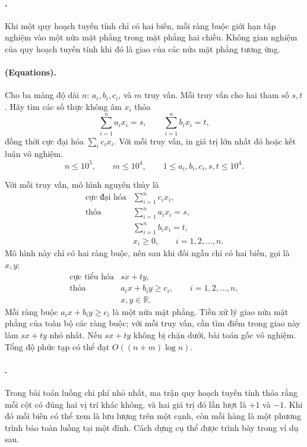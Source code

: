 \documentclass[11pt]{article}
\begin{document}
\paragraph{.}
Khi một quy hoạch tuyến tính chỉ có hai biến, mỗi ràng buộc giới hạn tập
nghiệm vào một nửa mặt phẳng trong mặt phẳng hai chiều. Không gian nghiệm của
quy hoạch tuyến tính khi đó là giao của các nửa mặt phẳng tương ứng.

\paragraph{ (Equations).}
Cho ba mảng độ dài \(n\): \(a_i,b_i,c_i\), và \(m\) truy vấn. Mỗi truy vấn cho
hai tham số \(s,t\). Hãy tìm các số thực không âm \(x_i\) thỏa
\[
  \sum_{i=1}^{n}a_ix_i=s,\qquad
  \sum_{i=1}^{n}b_ix_i=t,
\]
đồng thời cực đại hóa \(\sum_i c_ix_i\). Với mỗi truy vấn, in giá trị lớn
nhất đó hoặc kết luận vô nghiệm.
\[
  n\le 10^5,\qquad m\le 10^4,\qquad
  1\le a_i,b_i,c_i,s,t\le 10^4.
\]

Với mỗi truy vấn, mô hình nguyên thủy là
\[
\begin{array}{ll}
\text{cực đại hóa} & \displaystyle \sum_{i=1}^{n}c_ix_i,\\
\text{thỏa} & \displaystyle \sum_{i=1}^{n}a_ix_i=s,\\
& \displaystyle \sum_{i=1}^{n}b_ix_i=t,\\
& x_i\ge 0,\qquad i=1,2,\ldots,n.
\end{array}
\]
Mô hình này chỉ có hai ràng buộc, nên sau khi đối ngẫu chỉ có hai biến, gọi là
\(x,y\):
\[
\begin{array}{ll}
\text{cực tiểu hóa} & sx+ty,\\
\text{thỏa} & a_ix+b_iy\ge c_i,\qquad i=1,2,\ldots,n,\\
& x,y\in\mathbb{R}.
\end{array}
\]
Mỗi ràng buộc \(a_ix+b_iy\ge c_i\) là một nửa mặt phẳng. Tiền xử lý giao nửa
mặt phẳng của toàn bộ các ràng buộc; với mỗi truy vấn, cần tìm điểm trong
giao này làm \(sx+ty\) nhỏ nhất. Nếu \(sx+ty\) không bị chặn dưới, bài toán
gốc vô nghiệm. Tổng độ phức tạp có thể đạt \(O((n+m)\log n)\).

\paragraph{.}
Trong bài toán luồng chi phí nhỏ nhất, ma trận quy hoạch tuyến tính thỏa rằng
mỗi cột có đúng hai vị trí khác không, và hai giá trị đó lần lượt là \(+1\) và
\(-1\). Khi đó mỗi biến có thể xem là lưu lượng trên một cạnh, còn mỗi hàng là
một phương trình bảo toàn luồng tại một đỉnh. Cách dựng cụ thể được trình bày
trong ví dụ sau.
\end{document}
